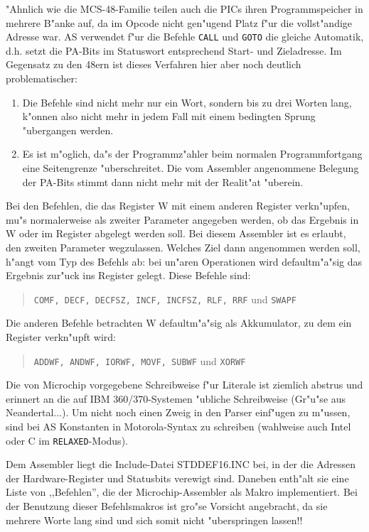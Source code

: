 \documentclass[12pt,a4paper,twoside]{report}
\newcommand{\tty}[1]{{\tt #1}}
\newcommand{\asname}{AS}
\begin{document}
"Ahnlich wie die MCS-48-Familie teilen auch die PICs ihren
Programmspeicher in mehrere B"anke auf, da im Opcode nicht gen"ugend Platz
f"ur die vollst"andige Adresse war.  \asname{} verwendet f"ur die Befehle \tty{CALL}
und \tty{GOTO} die gleiche Automatik, d.h. setzt die PA-Bits im
Statuswort entsprechend Start- und Zieladresse.  Im Gegensatz zu den 48ern
ist dieses Verfahren hier aber noch deutlich problematischer:
\begin{enumerate}
\item{Die Befehle sind nicht mehr nur ein Wort, sondern bis zu drei Worten
      lang, k"onnen also nicht mehr in jedem Fall mit einem bedingten Sprung
      "ubergangen werden.}
\item{Es ist m"oglich, da"s der Programmz"ahler beim normalen
      Programmfortgang eine Seitengrenze "uberschreitet.  Die vom Assembler
      angenommene Belegung der PA-Bits stimmt dann nicht mehr mit der
      Realit"at "uberein.}
\end{enumerate}
Bei den Befehlen, die das Register W mit einem anderen Register
verkn"upfen, mu"s normalerweise als zweiter Parameter angegeben werden, ob
das Ergebnis in W oder im Register abgelegt werden soll.  Bei diesem
Assembler ist es erlaubt, den zweiten Parameter wegzulassen.  Welches Ziel
dann angenommen werden soll, h"angt vom Typ des Befehls ab: bei un"aren
Operationen wird defaultm"a"sig das Ergebnis zur"uck ins Register gelegt.
Diese Befehle sind:
\begin{quote}
{\tt COMF, DECF, DECFSZ, INCF, INCFSZ, RLF, RRF} und {\tt SWAPF}
\end{quote}
Die anderen Befehle betrachten W defaultm"a"sig als Akkumulator, zu dem ein
Register verkn"upft wird:
\begin{quote}
{\tt ADDWF, ANDWF, IORWF, MOVF, SUBWF} und {\tt XORWF}
\end{quote}
\par
Die von Microchip vorgegebene Schreibweise f"ur Literale ist ziemlich
abstrus und erinnert an die auf IBM 360/370-Systemen "ubliche Schreibweise
(Gr"u"se aus Neandertal...).  Um nicht noch einen Zweig in den Parser
einf"ugen zu m"ussen, sind bei \asname{} Konstanten in
Motorola-Syntax zu schreiben (wahlweise auch Intel oder C im \tty{RELAXED}-Modus).
\par
Dem Assembler liegt die Include-Datei STDDEF16.INC bei, in der die Adressen
der Hardware-Register und Statusbits verewigt sind.  Daneben enth"alt sie
eine Liste von ,,Befehlen'', die der Microchip-Assembler als Makro
implementiert.  Bei der Benutzung dieser Befehlsmakros ist gro"se Vorsicht
angebracht, da sie mehrere Worte lang sind und sich somit nicht "uberspringen
lassen!!
\end{document}
